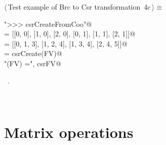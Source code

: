 \documentclass[11pt,oneside]{article}	%
\begin{document}
\begin{flushleft} \small
\begin{minipage}{\linewidth} \label{scrap7}
\protect{}$\langle\,$Test example of Brc to Csr transformation\nobreak\ {\footnotesize 4c}$\,\rangle\equiv$
\vspace{-1ex}
\begin{list}{}{} \item
\mbox{}\verb@print "\n>>> csrCreateFromCoo"@\\
\mbox{}\verb@V = [[0, 0], [1, 0], [2, 0], [0, 1], [1, 1], [2, 1]]@\\
\mbox{}\verb@FV = [[0, 1, 3], [1, 2, 4], [1, 3, 4], [2, 4, 5]]@\\
\mbox{}\verb@csrFV = csrCreate(FV)@\\
\mbox{}\verb@print "\ncsrCreate(FV) =\n", csrFV@\\
\mbox{}\verb@@{\NWsep}
\end{list}
\vspace{-1ex}
\footnotesize\addtolength{\baselineskip}{-1ex}
\begin{list}{}{\setlength{\itemsep}{-\parsep}\setlength{\itemindent}{-\leftmargin}}
\item \NWtxtMacroRefIn\ .
\end{list}
\end{minipage}\\[4ex]
\end{flushleft}

\section{Matrix operations}
\end{document}
